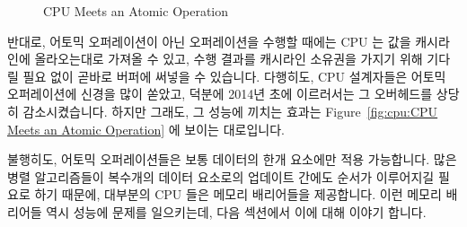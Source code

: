 \begin{figure}[htb]
\centering
{}
\caption{CPU Meets an Atomic Operation}
\end{figure}

반대로, 어토믹 오퍼레이션이 아닌 오퍼레이션을 수행할 때에는 CPU 는 값을
캐시라인에 올라오는대로 가져올 수 있고, 수행 결과를 캐시라인 소유권을 가지기
위해 기다릴 필요 없이 곧바로 버퍼에 써넣을 수 있습니다.
다행히도, CPU 설계자들은 어토믹 오퍼레이션에 신경을 많이 쏟았고, 덕분에 2014년
초에 이르러서는 그 오버헤드를 상당히 감소시켰습니다.
하지만 그래도, 그 성능에 끼치는 효과는
Figure~\ref{fig:cpu:CPU Meets an Atomic Operation} 에 보이는 대로입니다.

불행히도, 어토믹 오퍼레이션들은 보통 데이터의 한개 요소에만 적용 가능합니다.
많은 병렬 알고리즘들이 복수개의 데이터 요소로의 업데이트 간에도 순서가
이루어지길 필요로 하기 때문에, 대부분의 CPU 들은 메모리 배리어들을 제공합니다.
이런 메모리 배리어들 역시 성능에 문제를 일으키는데, 다음 섹션에서 이에 대해
이야기 합니다.

